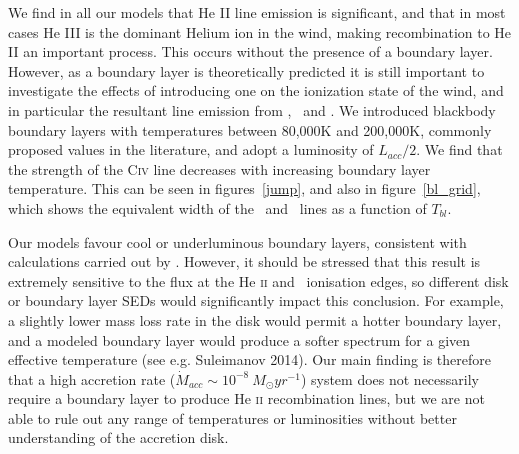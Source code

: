 \documentclass[preprint, a4paper, 11pt]{aastex}
\begin{document}
We find in all our models that He II line emission is significant, and that 
in most cases He  III is the dominant Helium ion in the wind, making recombination
to He II an important process. This occurs without the presence of a boundary 
layer. However, as a boundary layer is theoretically predicted 
it is still important to investigate the effects of introducing
one on the ionization state of the wind, and in particular
the resultant line emission from \heiiuv, \heiiopt\ and \civfull. 
We introduced blackbody boundary layers with temperatures between 80,000K and 200,000K,
commonly proposed values in the literature, and adopt a luminosity of
$L_{acc} / 2$. We find that the strength of the C\textsc{iv} line decreases
with increasing boundary layer temperature. This can be seen
in figures~\ref{jump}, and also in figure~\ref{bl_grid}, which
shows the equivalent width of the \civfull\ and \heiiuv\ lines as 
a function of $T_{bl}$.

Our models favour cool or underluminous boundary layers,
consistent with calculations carried out by
\cite{hoaredrew1993}. However,
it should be stressed that this result is extremely
sensitive to the flux at the He \textsc{ii} and \civ\ 
ionisation edges, so different disk or boundary layer
SEDs would significantly impact this conclusion.
For example, a slightly lower mass loss rate in the disk
would permit a hotter boundary layer, and a modeled boundary layer
would produce a softer spectrum for a given effective temperature
(see e.g. Suleimanov 2014). Our main finding
is therefore that a high accretion rate 
($\dot{M}_{acc} \sim 10^{-8}~M_{\odot}yr^{-1}$) 
system does not necessarily require a boundary layer to produce
He \textsc{ii} recombination lines, but we are not
able to rule out any range of temperatures or
luminosities without better understanding of
the accretion disk.


\end{document}
